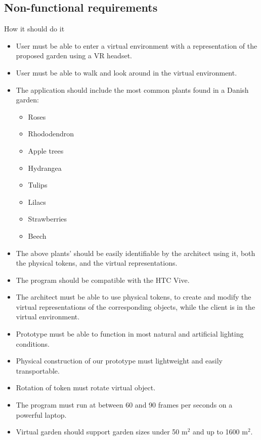 \subsection{Non-functional requirements}
How it should do it\\
\begin{itemize}
	\item User must be able to enter a virtual environment with a representation of the proposed garden using a VR headset.
	\item User must be able to walk and look around in the virtual environment.
	\item The application should include the most common plants found in a Danish garden:
	\begin{itemize}
		\item Roses
		\item Rhododendron
		\item Apple trees
		\item Hydrangea
		\item Tulips
		\item Lilacs
		\item Strawberries
		\item Beech
	\end{itemize}
	\item The above plants' should be easily identifiable by the architect using it, both the physical tokens, and the virtual representations.
	\item The program should be compatible with the HTC Vive.
	\item The architect must be able to use physical tokens, to create and modify the virtual representations of the corresponding objects, while the client is in the virtual environment.
	\item Prototype must be able to function in most natural and artificial lighting conditions.
	\item Physical construction of our prototype must lightweight and easily transportable. 
	\item Rotation of token must rotate virtual object.
	\item The program must run at between 60 and 90 frames per seconds on a powerful laptop.
	
	\item Virtual garden should support garden sizes under 50 m$^2$ and up to 1600 m$^2$.
	

\end{itemize}

